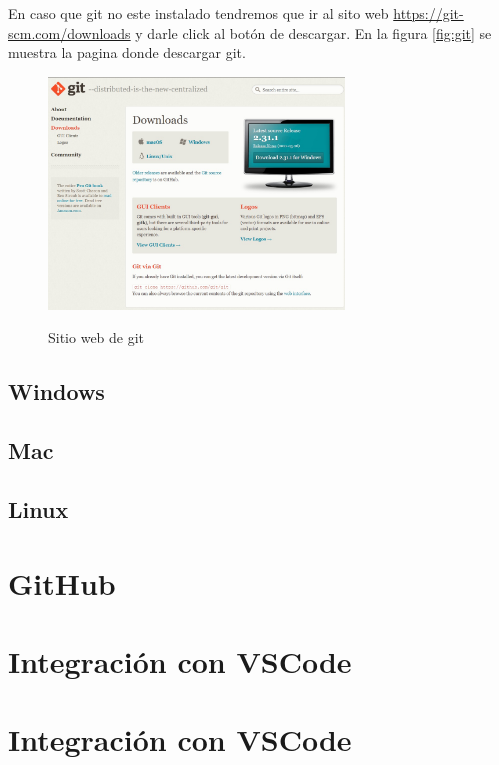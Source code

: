\documentclass[11pt, oneside]{article}
\begin{document}
En caso que git no este instalado tendremos que ir al sito web \url{https://git-scm.com/downloads} y darle click al botón de descargar. En la figura \ref{fig:git} se muestra la pagina donde descargar git.
\begin{figure}[h]
  \centering
  \caption{Sitio web de git}
  \includegraphics[width=0.70\textwidth]{./img/ind-from-web.jpeg}
  \label{fig:git-web}
\end{figure}

\subsection{Windows}
\subsection{Mac}
\subsection{Linux}

\section{GitHub}

\section{Integración con VSCode}
\section{Integración con VSCode}
\end{document}
